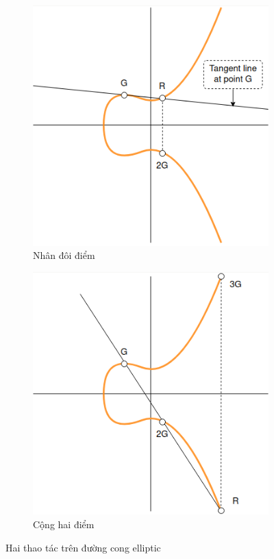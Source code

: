 \begin{figure}[h]
	\centering
	\begin{subfigure}[b]{0.4\textwidth}
		\centering
		\includegraphics[width=\textwidth]{images/Point_doubling.png}
		\caption{Nhân đôi điểm}
		\label{fig:poindoubling}
	\end{subfigure}
	\begin{subfigure}[b]{0.4\textwidth}
		\centering
		\includegraphics[width=\textwidth]{images/Point_addition.png}
		\caption{Cộng hai điểm}
		\label{fig:poinadditioning}
	\end{subfigure}

	\caption{Hai thao tác trên đường cong elliptic}

\end{figure}


